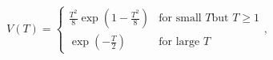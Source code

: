 \begin{equation}\label{V1}
V(T)=\left\{
\begin{array}{ll}
\frac{T^{2}}{8}\exp\left(1-\frac{T^{2}}{8}\right) & \mbox{for small $T$
but $T\ge 1$} \\
\exp\left(-\frac{T}{2}\right) & \mbox{for large $T$} 
\end{array}
,
\right.
\end{equation}

